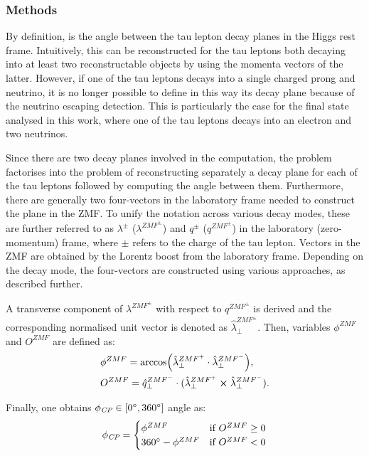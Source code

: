 \subsubsection{Methods}

By definition, \phicp is the angle between the tau lepton decay planes in the Higgs rest frame. Intuitively, this can be reconstructed for the tau leptons both decaying into at least two reconstructable objects by using the momenta vectors of the latter. However, if one of the tau leptons decays into a single charged prong and neutrino, it is no longer possible to define in this way its decay plane because of the neutrino escaping detection. This is particularly the case for the \et final state analysed in this work, where one of the tau leptons decays into an electron and two neutrinos.

Since there are two decay planes involved in the \phicp computation, the problem factorises into the problem of reconstructing separately a decay plane for each of the tau leptons followed by computing the angle between them. Furthermore, there are generally two four-vectors in the laboratory frame needed to construct the plane in the ZMF. To unify the notation across various decay modes, these are further referred to as $\lambda^\pm$ ($\lambda^{ZMF^\pm}$) and $q^\pm$ ($q^{ZMF^\pm}$) in the laboratory (zero-momentum) frame, where $\pm$ refers to the charge of the tau lepton. Vectors in the ZMF are obtained by the Lorentz boost from the laboratory frame. Depending on the decay mode, the four-vectors are constructed using various approaches, as described further.

A transverse component of $\lambda^{ZMF^\pm}$ with respect to $q^{ZMF^\pm}$ is derived and the corresponding normalised unit vector is denoted as $\hat{\lambda}_\perp^{ZMF^\pm}$. Then, variables $\phi^{ZMF}$ and $O^{ZMF}$ are defined as:
\begin{align}
    &\phi^{ZMF} = \arccos(\hat{\lambda}_\perp^{ZMF^+} \cdot \hat{\lambda}_\perp^{ZMF^-}),\\
    &O^{ZMF} = \hat{q}_\perp^{ZMF^-} \cdot (\hat{\lambda}_\perp^{ZMF^+} \cross \hat{\lambda}_\perp^{ZMF^-}).
\end{align}

Finally, one obtains $\phi_{\textit{CP}} \in [0^\circ,360^\circ]$ angle as:
\begin{equation}\label{eq:phicp}
    \phi_{\textit{CP}} = 
    \begin{cases}
    \phi^{ZMF} & \text{if} ~O^{ZMF} \geq 0 \\
    360^\circ - \phi^{ZMF} & \text{if} ~O^{ZMF} < 0
    \end{cases}
\end{equation}


